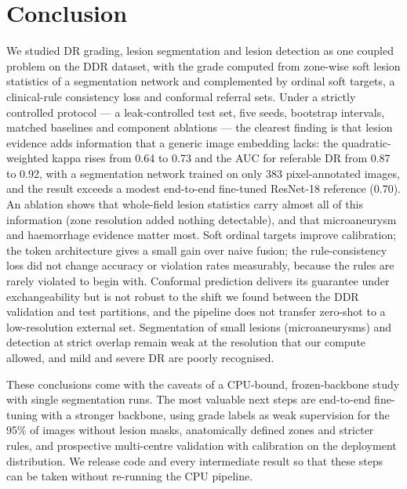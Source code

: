 \section{Conclusion}
\label{sec:conclusion}
We studied DR grading, lesion segmentation and lesion detection as one coupled problem on the DDR dataset, with the grade computed from zone-wise soft lesion statistics of a segmentation network and complemented by ordinal soft targets, a clinical-rule consistency loss and conformal referral sets. Under a strictly controlled protocol --- a leak-controlled test set, five seeds, bootstrap intervals, matched baselines and component ablations --- the clearest finding is that lesion evidence adds information that a generic image embedding lacks: the quadratic-weighted kappa rises from 0.64 to 0.73 and the AUC for referable DR from 0.87 to 0.92, with a segmentation network trained on only 383 pixel-annotated images, and the result exceeds a modest end-to-end fine-tuned ResNet-18 reference (0.70). An ablation shows that whole-field lesion statistics carry almost all of this information (zone resolution added nothing detectable), and that microaneurysm and haemorrhage evidence matter most. Soft ordinal targets improve calibration; the token architecture gives a small gain over naive fusion; the rule-consistency loss did not change accuracy or violation rates measurably, because the rules are rarely violated to begin with. Conformal prediction delivers its guarantee under exchangeability but is not robust to the shift we found between the DDR validation and test partitions, and the pipeline does not transfer zero-shot to a low-resolution external set. Segmentation of small lesions (microaneurysms) and detection at strict overlap remain weak at the resolution that our compute allowed, and mild and severe DR are poorly recognised.

These conclusions come with the caveats of a CPU-bound, frozen-backbone study with single segmentation runs. The most valuable next steps are end-to-end fine-tuning with a stronger backbone, using grade labels as weak supervision for the 95\% of images without lesion masks, anatomically defined zones and stricter rules, and prospective multi-centre validation with calibration on the deployment distribution. We release code and every intermediate result so that these steps can be taken without re-running the CPU pipeline.
